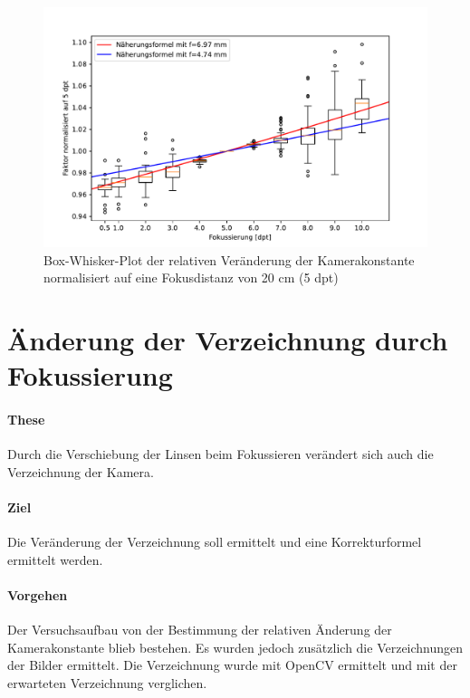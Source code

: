 \documentclass[./00PhotoBox.tex]{subfiles}
\begin{document}
\begin{figure}
    \centering
    \includegraphics[width=1\textwidth]{./img/fokus_faktor_diagramm_box.pdf}
    \caption{Box-Whisker-Plot der relativen Veränderung der Kamerakonstante normalisiert auf eine Fokusdistanz von 20 cm (5 dpt)} %
    \label{img:fokus_faktor} %
\end{figure}



\section{Änderung der Verzeichnung durch Fokussierung}

\paragraph{These}
Durch die Verschiebung der Linsen beim Fokussieren verändert sich auch die Verzeichnung der Kamera.

\paragraph{Ziel}
Die Veränderung der Verzeichnung soll ermittelt und eine Korrekturformel ermittelt werden.

\paragraph{Vorgehen}
Der Versuchsaufbau von der Bestimmung der relativen Änderung der Kamerakonstante blieb bestehen. Es wurden jedoch zusätzlich die Verzeichnungen der Bilder ermittelt. Die Verzeichnung wurde mit OpenCV ermittelt und mit der erwarteten Verzeichnung verglichen.
\end{document}
